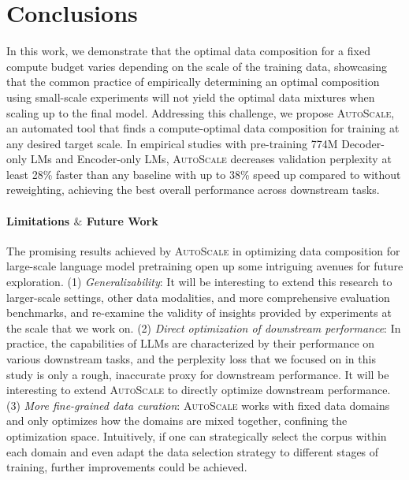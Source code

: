 \documentclass{article} %
\newcommand{\kang}[1]{\textbf{\textcolor{cyan}{[Feiyang: #1]}}}
\begin{document}
\vspace{-0.5em}\section{Conclusions}\vspace{-0.5em}
In this work, we demonstrate that the optimal data composition for a fixed compute budget varies depending on the scale of the training data, showcasing that the common practice of empirically determining an optimal composition using small-scale experiments will not yield the optimal data mixtures when scaling up to the final model. Addressing this challenge, we propose \textsc{AutoScale}, an automated tool that finds a compute-optimal data composition for training at any desired target scale. In empirical studies with pre-training 774M Decoder-only LMs and Encoder-only LMs, \textsc{AutoScale} decreases validation perplexity at least 28\% faster than any baseline with up to 38\% speed up compared to without reweighting, achieving the best overall performance across downstream tasks. 

\vspace{-0.7em}\paragraph{Limitations $\&$ Future Work} The promising results achieved by \textsc{AutoScale} in optimizing data composition for large-scale language model pretraining open up some intriguing avenues for future exploration.
(1) \textit{Generalizability}: It will be interesting to extend this research to larger-scale settings, other data modalities, and more comprehensive evaluation benchmarks, and re-examine the validity of insights provided by experiments at the scale that we work on.
(2) \textit{Direct optimization of downstream performance}: In practice, the capabilities of LLMs are characterized by their performance on various downstream tasks, and the perplexity loss that we focused on in this study is only a rough, inaccurate proxy for downstream performance. It will be interesting to extend \textsc{AutoScale} to directly optimize downstream performance.
(3) \textit{More fine-grained data curation}: \textsc{AutoScale} works with fixed data domains and only optimizes how the domains are mixed together, confining the optimization space. Intuitively, if one can strategically select the corpus within each domain and even adapt the data selection strategy to different stages of training, further improvements could be achieved.
\end{document}
